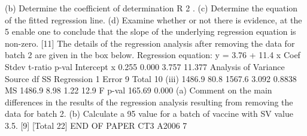 \documentclass[a4paper,12pt]{article}
\begin{document}
\begin{enumerate}
(b) Determine the coefficient of determination R 2 .
(c) Determine the equation of the fitted regression line.
(d) Examine whether or not there is evidence, at the 5%
enable one to conclude that the slope of the underlying regression
equation is non-zero.
[11]
The details of the regression analysis after removing the data for batch 2 are given in
the box below.
Regression equation: y = 3.76 + 11.4 x
Coef
Stdev
t-ratio p-val
Intercept
x 0.255
0.000
3.757
11.377
Analysis of Variance
Source
df
SS
Regression 1
Error
9
Total
10
(iii)
1486.9
80.8
1567.6
3.092
0.8838
MS
1486.9
8.98
1.22
12.9
F p-val
165.69 0.000
(a) Comment on the main differences in the results of the regression
analysis resulting from removing the data for batch 2.
(b) Calculate a 95%
value for a batch of vaccine with SV value 3.5.
[9]
[Total 22]
END OF PAPER
CT3 A2006 7


\end{enumerate}
\end{document}
